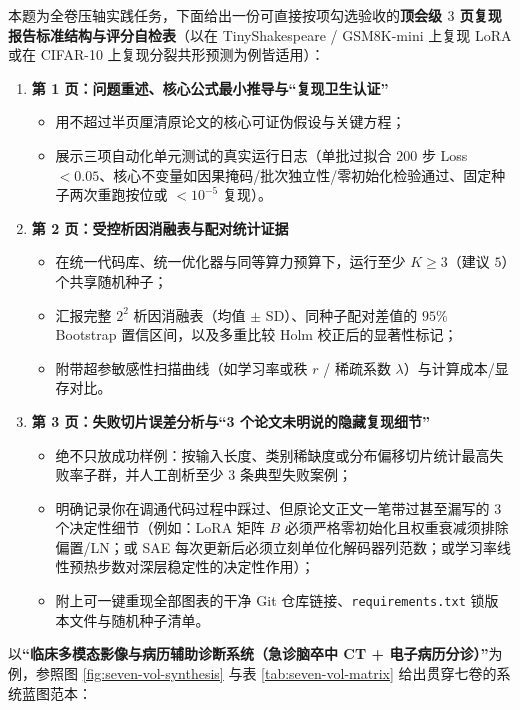 本题为全卷压轴实践任务，下面给出一份可直接按项勾选验收的\textbf{顶会级 $3$ 页复现报告标准结构与评分自检表}（以在 TinyShakespeare / GSM8K-mini 上复现 LoRA 或在 CIFAR-10 上复现分裂共形预测为例皆适用）：
\begin{enumerate}
  \item \textbf{第 1 页：问题重述、核心公式最小推导与“复现卫生认证”}
  \begin{itemize}
    \item 用不超过半页厘清原论文的核心可证伪假设与关键方程；
    \item 展示三项自动化单元测试的真实运行日志（单批过拟合 $200$ 步 Loss $< 0.05$、核心不变量如因果掩码/批次独立性/零初始化检验通过、固定种子两次重跑按位或 $< 10^{-5}$ 复现）。
  \end{itemize}
  \item \textbf{第 2 页：受控析因消融表与配对统计证据}
  \begin{itemize}
    \item 在统一代码库、统一优化器与同等算力预算下，运行至少 $K \ge 3$（建议 $5$）个共享随机种子；
    \item 汇报完整 $2^2$ 析因消融表（均值 $\pm$ SD）、同种子配对差值的 $95\%$ Bootstrap 置信区间，以及多重比较 Holm 校正后的显著性标记；
    \item 附带超参敏感性扫描曲线（如学习率或秩 $r$ / 稀疏系数 $\lambda$）与计算成本/显存对比。
  \end{itemize}
  \item \textbf{第 3 页：失败切片误差分析与“3 个论文未明说的隐藏复现细节”}
  \begin{itemize}
    \item 绝不只放成功样例：按输入长度、类别稀缺度或分布偏移切片统计最高失败率子群，并人工剖析至少 $3$ 条典型失败案例；
    \item 明确记录你在调通代码过程中踩过、但原论文正文一笔带过甚至漏写的 $3$ 个决定性细节（例如：LoRA 矩阵 $B$ 必须严格零初始化且权重衰减须排除偏置/LN；或 SAE 每次更新后必须立刻单位化解码器列范数；或学习率线性预热步数对深层稳定性的决定性作用）；
    \item 附上可一键重现全部图表的干净 Git 仓库链接、\texttt{requirements.txt} 锁版本文件与随机种子清单。
  \end{itemize}
\end{enumerate}


以\textbf{“临床多模态影像与病历辅助诊断系统（急诊脑卒中 CT + 电子病历分诊）”}为例，参照图 \ref{fig:seven-vol-synthesis} 与表 \ref{tab:seven-vol-matrix} 给出贯穿七卷的系统蓝图范本：

